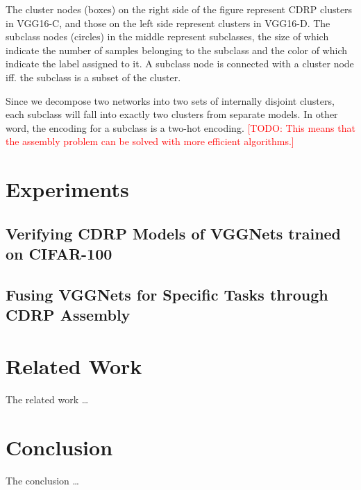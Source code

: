 \documentclass[sigplan,10pt,review]{acmart}\settopmatter{printfolios=true,printccs=false,printacmref=false}
\newcommand{\todo}[1]{\textcolor{red}{[TODO: #1]}}
\begin{document}
The cluster nodes (boxes) on the right side of the figure represent CDRP clusters in VGG16-C, and those on the left side represent clusters in VGG16-D.
The subclass nodes (circles) in the middle represent subclasses, the size of which indicate the number of samples belonging to the subclass and the color of which indicate the label assigned to it.
A subclass node is connected with a cluster node iff. the subclass is a subset of the cluster.

Since we decompose two networks into two sets of internally disjoint clusters, each subclass will fall into exactly two clusters from separate models.
In other word, the encoding for a subclass is a two-hot encoding.
\todo{This means that the assembly problem can be solved with more efficient algorithms.}

\section{Experiments}
\subsection{Verifying CDRP Models of VGGNets trained on CIFAR-100}
\subsection{Fusing VGGNets for Specific Tasks through CDRP Assembly}

\section{Related Work}
The related work \dots

\section{Conclusion}
The conclusion \dots


% 
% 




\end{document}
